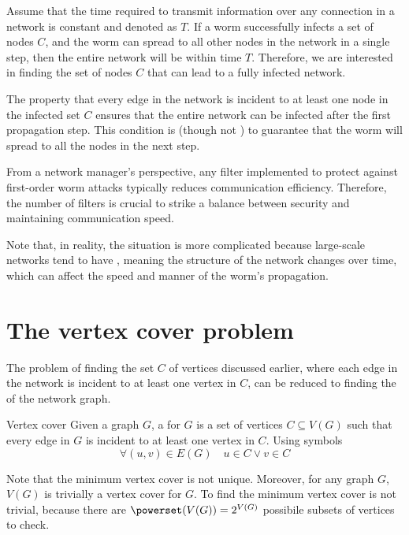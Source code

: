 \documentclass[a4paper, 12pt]{report}
\begin{document}
    Assume that the time required to transmit information over any connection in a network is constant and denoted as $T$. If a worm successfully infects a set of nodes $C$, and the worm can spread to all other nodes in the network in a single step, then the entire network will be  within time $T$. Therefore, we are interested in finding the set of nodes $C$ that can lead to a fully infected network.

    The property that every edge in the network is incident to at least one node in the infected set $C$ ensures that the entire network can be infected after the first propagation step. This condition is  (though not ) to guarantee that the worm will spread to all the nodes in the next step.

    From a network manager's perspective, any filter implemented to protect against first-order worm attacks typically reduces communication efficiency. Therefore,  the number of filters is crucial to strike a balance between security and maintaining communication speed.

    Note that, in reality, the situation is more complicated because large-scale networks tend to have , meaning the structure of the network changes over time, which can affect the speed and manner of the worm's propagation.

    \section{The vertex cover problem}

    The problem of finding the set $C$ of vertices discussed earlier, where each edge in the network is incident to at least one vertex in $C$, can be reduced to finding the  of the network graph.
    
    \begin{frameddefn}{Vertex cover}
        Given a graph $G$, a  for $G$ is a set of vertices $C \subseteq V(G)$ such that every edge in $G$ is incident to at least one vertex in $C$. Using symbols $$\forall (u, v) \in E(G) \quad u \in C \lor v \in C$$
    \end{frameddefn}

    Note that the minimum vertex cover is not unique. Moreover, for any graph $G$, $V(G)$ is trivially a vertex cover for $G$. To find the minimum vertex cover is not trivial, because there are $\powerset(V(G)) = 2^{V(G)}$ possibile subsets of vertices to check.
    
\end{document}
